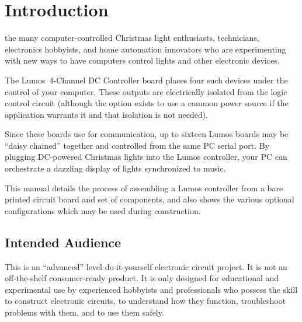 \documentclass[letterpaper,twoside,onecolumn,openright,final]{memoir}
\begin{document}
\begin{center}
\end{center}

\newpage
\tableofcontents
\listoffigures
\listoftables

\mainmatter

\chapter{Introduction}
 the many computer-controlled
Christmas light enthusiasts,  technicians, electronics hobbyists,
and home automation innovators who are experimenting with new ways to have computers
control lights and other electronic devices.

The Lumos\TM\ 4-Channel DC Controller board places four such devices under the control
of your computer.  These outputs are 
electrically isolated from the logic control circuit (although the option exists to use
a common power source if the application warrants it and that isolation is not needed).

Since these boards use  for communication, up to sixteen Lumos
boards may be ``daisy chained'' together and controlled from 
the same PC serial port.
By plugging DC-powered Christmas lights into the Lumos controller, your PC can orchestrate
a dazzling display of lights synchronized to music.

This manual details the process of assembling a Lumos controller from a bare printed
circuit board and set of components, and also shows the various optional configurations
which may be used during construction.

\section{Intended Audience}
This is an ``advanced'' level do-it-yourself electronic circuit project.  It is not
an off-the-shelf consumer-ready product.  It is only designed for educational and experimental
use by experienced hobbyists and professionals who possess the skill to construct electronic
circuits, to understand how they function, troubleshoot problems with them, and to use them safely.






\end{document}
